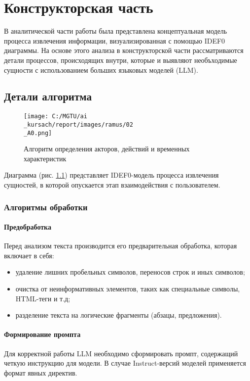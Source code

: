 \chapter{Конструкторская часть}

В аналитической части работы была представлена концептуальная модель процесса извлечения информации, визуализированная с помощью IDEF0 диаграммы. 
На основе этого анализа в конструкторской части рассматриваются детали процессов, происходящих внутри, которые и выявляют необъходимые сущности с использованием больших языковых моделей (LLM).

\section{Детали алгоритма}

\begin{figure}[H]
    \centering
    \texttt{[image: C:/MGTU/ai\\\_kursach/report/images/ramus/02\\\_A0.png]}
    \caption{Алгоритм определения акторов, действий и временных характеристик}
    \label{fig:idef0_1}
\end{figure}

Диаграмма (рис. \ref{fig:idef0_1}) представляет IDEF0-модель процесса извлечения сущностей, в которой опускается этап взаимодействия с пользователем.

\subsection{Алгоритмы обработки}

\subsubsection{Предобработка}
Перед анализом текста производится его предварительная обработка, которая включает в себя:
\begin{itemize}
    \item удаление лишних пробельных символов, переносов строк и иных символов;
    \item очистка от неинформативных элементов, таких как специальные символы, HTML-теги и т.д;
    \item разделение текста на логические фрагменты (абзацы, предложения).
\end{itemize}

\subsubsection{Формирование промпта}
Для корректной работы LLM необходимо сформировать промпт, содержащий четкую инструкцию для модели. 
В случае Instruct-версий моделей применяется формат явных директив. 


